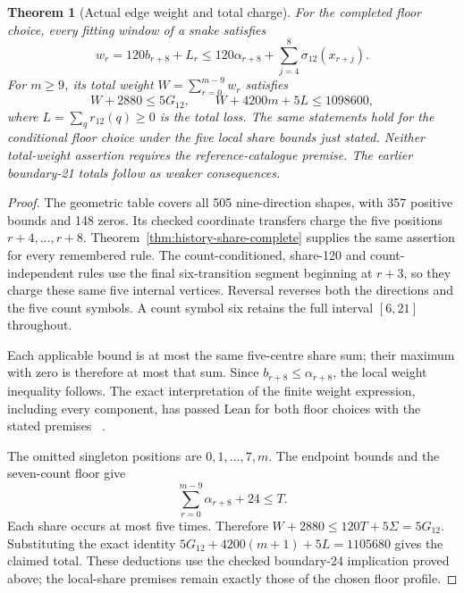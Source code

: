 \documentclass[11pt,a4paper]{article}
\newtheorem{theorem}{Theorem}[section]
\theoremstyle{definition}
\theoremstyle{remark}
\begin{document}
\begin{theorem}[Actual edge weight and total charge]\label{thm:actual-weight-budget}
For the completed floor choice, every fitting window of a snake satisfies
\[
w_r=120b_{r+8}+L_r
\le120\alpha_{r+8}+\sum_{j=4}^{8}\sigma_{12}(x_{r+j}).
\]
For $m\ge9$, its total weight $W=\sum_{r=0}^{m-9}w_r$ satisfies
\[
W+2880\le5G_{12},\qquad W+4200m+5L\le1098600,
\]
where $L=\sum_qr_{12}(q)\ge0$ is the total loss.
The same statements hold for the conditional floor choice under the five
local share bounds just stated. Neither total-weight assertion requires
the reference-catalogue premise. The earlier boundary-21 totals follow
as weaker consequences.
\end{theorem}
\begin{proof}
The geometric table covers all 505 nine-direction shapes, with 357 positive
bounds and 148 zeros. Its checked coordinate transfers charge the five
positions $r+4,\ldots,r+8$. Theorem~\ref{thm:history-share-complete} supplies
the same assertion for every remembered rule. The count-conditioned,
share-120 and count-independent rules use the final six-transition segment
beginning at $r+3$, so they charge these same five internal vertices.
Reversal reverses both the directions and the five count symbols. A count
symbol six retains the full interval $[6,21]$ throughout.

Each applicable bound is at most the same five-centre share sum; their
maximum with zero is therefore at most that sum. Since
$b_{r+8}\le\alpha_{r+8}$, the local weight inequality follows. The exact
interpretation of the finite weight expression, including every component,
has passed Lean for both floor choices with the stated premises
~\cite{weightintegrationarchive}.

The omitted singleton positions are $0,1,\ldots,7,m$. The endpoint
bounds and the seven-count floor give
\[
\sum_{r=0}^{m-9}\alpha_{r+8}+24\le T.
\]
Each share occurs at most five times. Therefore
$W+2880\le120T+5\Sigma=5G_{12}$. Substituting the exact identity
$5G_{12}+4200(m+1)+5L=1105680$ gives the claimed total.
These deductions use the checked boundary-24 implication proved above;
the local-share premises remain exactly those of the chosen floor profile.
\end{proof}
\end{document}
